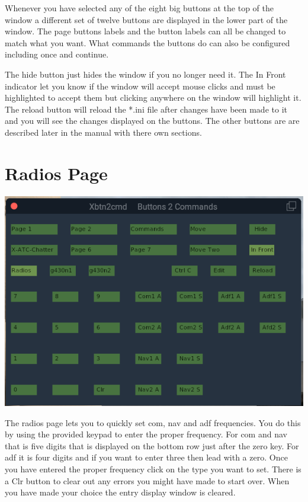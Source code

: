 \documentclass[11pt,parskip=half,a4paper]{scrartcl}
\begin{document}
Whenever you have selected any of the eight big buttons at the top of the window a different set of twelve buttons are displayed in the lower part of the window. The page buttons labels and the button labels can all be changed to match what you want. What commands the buttons do can also be configured including once and continue. \newline

The hide button just hides the window if you no longer need it. The In Front indicator let you know if the window will accept mouse clicks and must be highlighted to accept them but clicking anywhere on the window will highlight it. The reload button will reload the *.ini file after changes have been made to it and you will see the changes displayed on the buttons. The other buttons are are described later in the manual with there own sections. 

\newpage
\section{Radios Page}

\begin{center}
\includegraphics[width=15cm]{Xbtn2cmd_Radios_Page.png}
\end{center}

The radios page lets you to quickly set com, nav and adf frequencies. You do this by using the provided keypad to enter the proper frequency. For com and nav that is five digits that is displayed on the bottom row just after the zero key. For adf it is four digits and if you want to enter three then lead with a zero. Once you have entered the proper frequency click on the type you want to set. There is a Clr button to clear out any errors you might have made to start over. When you have made your choice the entry display window is cleared. \newline
\end{document}
